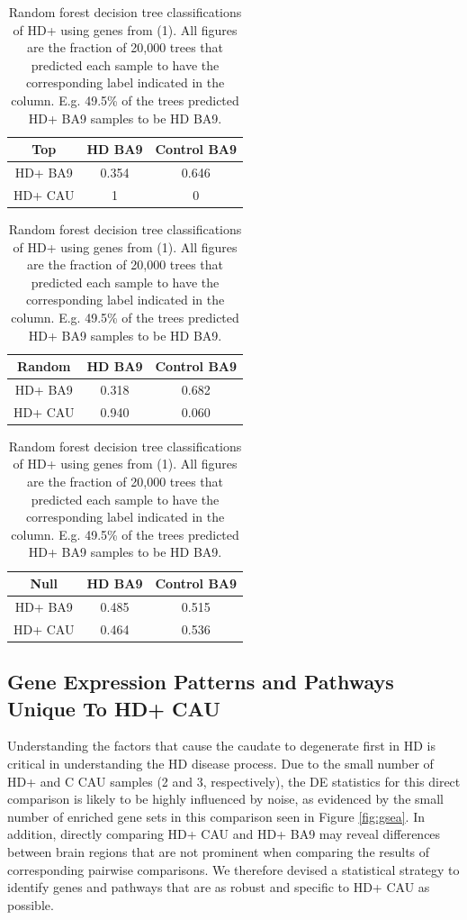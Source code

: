 \documentclass[fleqn,10pt,table]{wlscirep}
\begin{document}
\begin{table}[ht]
\begin{subtable}{.5\linewidth}
\centering
\begin{tabular}{ccc} \hline
Top 		& HD BA9 	& Control BA9   \\ \hline
HD+ BA9   	& 0.354 	& 0.646			\\
HD+ CAU   	& 1			& 0			\\ \hline
\end{tabular}
\caption{Trees built with top 250 DE genes from (1)}
\end{subtable}
\begin{subtable}{.5\linewidth}
\centering
\begin{tabular}{ccc} \hline
Random   	& HD BA9 	& Control BA9		\\ \hline
HD+ BA9   	& 0.318 	& 0.682			\\
HD+ CAU   	& 0.940		& 0.060			\\ \hline
\end{tabular}
\caption{Trees built with 250 random genes from (1)}
\end{subtable}
\begin{subtable}{.5\linewidth}
\centering
\begin{tabular}{ccc} \hline
Null 		& HD BA9 	& Control BA9		\\ \hline
HD+ BA9   	& 0.485		& 0.515		\\
HD+ CAU   	& 0.464		& 0.536		\\ \hline
\end{tabular}
\caption{Trees built with 250 random genes from (1) and shuffled labels}
\end{subtable}
\caption{Random forest decision tree classifications of HD+ using genes from (1). All figures are the fraction of 20,000 trees that predicted each sample to have the corresponding label indicated in the column. E.g. 49.5\% of the trees predicted HD+ BA9 samples to be HD BA9. \label{tab:rf_predict}}
\end{table} 


\subsection{Gene Expression Patterns and Pathways Unique To HD+ CAU}

Understanding the factors that cause the caudate to degenerate first in HD is critical in understanding the HD disease process.
Due to the small number of HD+ and C CAU samples (2 and 3, respectively), the DE statistics for this direct comparison is likely to be highly influenced by noise, as evidenced by the small number of enriched gene sets in this comparison seen in Figure \ref{fig:gsea}.
In addition, directly comparing HD+ CAU and HD+ BA9 may reveal differences between brain regions that are not prominent when comparing the results of corresponding pairwise comparisons.
We therefore devised a statistical strategy to identify genes and pathways that are as robust and specific to HD+ CAU as possible.
\end{document}
